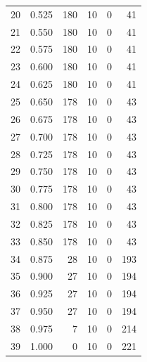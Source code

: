 \documentclass[a4paper,twoside,12pt]{book}
\begin{document}
\begin{appendices}
\begin{table}
\begin{tabular}{lrrrrr}
		20 &  0.525 &       180 &        10 &               0 &              41 \\
		21 &  0.550 &       180 &        10 &               0 &              41 \\
		22 &  0.575 &       180 &        10 &               0 &              41 \\
		23 &  0.600 &       180 &        10 &               0 &              41 \\
		24 &  0.625 &       180 &        10 &               0 &              41 \\
		25 &  0.650 &       178 &        10 &               0 &              43 \\
		26 &  0.675 &       178 &        10 &               0 &              43 \\
		27 &  0.700 &       178 &        10 &               0 &              43 \\
		28 &  0.725 &       178 &        10 &               0 &              43 \\
		29 &  0.750 &       178 &        10 &               0 &              43 \\
		30 &  0.775 &       178 &        10 &               0 &              43 \\
		31 &  0.800 &       178 &        10 &               0 &              43 \\
		32 &  0.825 &       178 &        10 &               0 &              43 \\
		33 &  0.850 &       178 &        10 &               0 &              43 \\
		34 &  0.875 &        28 &        10 &               0 &             193 \\
		35 &  0.900 &        27 &        10 &               0 &             194 \\
		36 &  0.925 &        27 &        10 &               0 &             194 \\
		37 &  0.950 &        27 &        10 &               0 &             194 \\
		38 &  0.975 &         7 &        10 &               0 &             214 \\
		39 &  1.000 &         0 &        10 &               0 &             221 \\
		\bottomrule
	\end{tabular}
\end{table}


\end{appendices}
\end{document}
